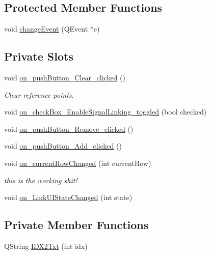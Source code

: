 \subsection*{Protected Member Functions}
\begin{CompactItemize}
\item 
void \hyperlink{class_references_dialog_b6cd42a4676ac1a0231eef46e086f509}{changeEvent} (QEvent $\ast$e)
\end{CompactItemize}
\subsection*{Private Slots}
\begin{CompactItemize}
\item 
void \hyperlink{class_references_dialog_f32e8c338d1772dab03e7049036c47ac}{on\_\-pushButton\_\-Clear\_\-clicked} ()
\begin{CompactList}\small\item\em Clear reference points. \item\end{CompactList}\item 
void \hyperlink{class_references_dialog_b83aae9c0988a30af4f832fc82acb626}{on\_\-checkBox\_\-EnableSignalLinking\_\-toggled} (bool checked)
\item 
void \hyperlink{class_references_dialog_c6c6d9391d07dafc29868088588489a3}{on\_\-pushButton\_\-Remove\_\-clicked} ()
\item 
void \hyperlink{class_references_dialog_5856ea2aab90b66afd6ed6d1d88e1c49}{on\_\-pushButton\_\-Add\_\-clicked} ()
\item 
void \hyperlink{class_references_dialog_8b163293d7e60e642a9ccd55ba0d5a8b}{on\_\-currentRowChanged} (int currentRow)
\begin{CompactList}\small\item\em this is the working shit! \item\end{CompactList}\item 
void \hyperlink{class_references_dialog_e5e604ebe9d640fc8dce542ff6dbc8a4}{on\_\-LinkUIStateChanged} (int state)
\end{CompactItemize}
\subsection*{Private Member Functions}
\begin{CompactItemize}
\item 
QString \hyperlink{class_references_dialog_c9d8d09d650f73f5f55aa86e0e5c2cd7}{IDX2Txt} (int idx)
\end{CompactItemize}
